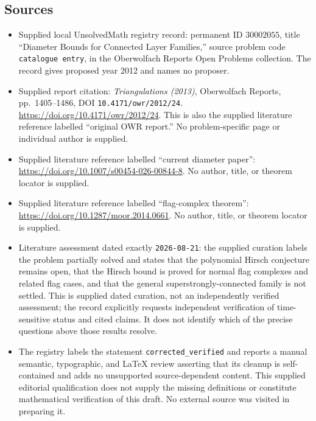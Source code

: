 \documentclass[11pt]{article}
\begin{document}
\subsection{Sources}
\begin{itemize}
\item Supplied local UnsolvedMath registry record: permanent ID \(30002055\), title ``Diameter Bounds for Connected Layer Families,'' source problem code \texttt{catalogue entry}, in the Oberwolfach Reports Open Problems collection. The record gives proposed year 2012 and names no proposer.
\item Supplied report citation: \emph{Triangulations (2013)}, Oberwolfach Reports, pp.~1405--1486, DOI \texttt{10.4171/owr/2012/24}. \url{https://doi.org/10.4171/owr/2012/24}. This is also the supplied literature reference labelled ``original OWR report.'' No problem-specific page or individual author is supplied.
\item Supplied literature reference labelled ``current diameter paper'': \url{https://doi.org/10.1007/s00454-026-00844-8}. No author, title, or theorem locator is supplied.
\item Supplied literature reference labelled ``flag-complex theorem'': \url{https://doi.org/10.1287/moor.2014.0661}. No author, title, or theorem locator is supplied.
\item Literature assessment dated exactly \texttt{2026-08-21}: the supplied curation labels the problem partially solved and states that the polynomial Hirsch conjecture remains open, that the Hirsch bound is proved for normal flag complexes and related flag cases, and that the general superstrongly-connected family is not settled. This is supplied dated curation, not an independently verified assessment; the record explicitly requests independent verification of time-sensitive status and cited claims. It does not identify which of the precise questions above those results resolve.
\item The registry labels the statement \texttt{corrected\_verified} and reports a manual semantic, typographic, and LaTeX review asserting that its cleanup is self-contained and adds no unsupported source-dependent content. This supplied editorial qualification does not supply the missing definitions or constitute mathematical verification of this draft. No external source was visited in preparing it.
\end{itemize}
\end{document}
